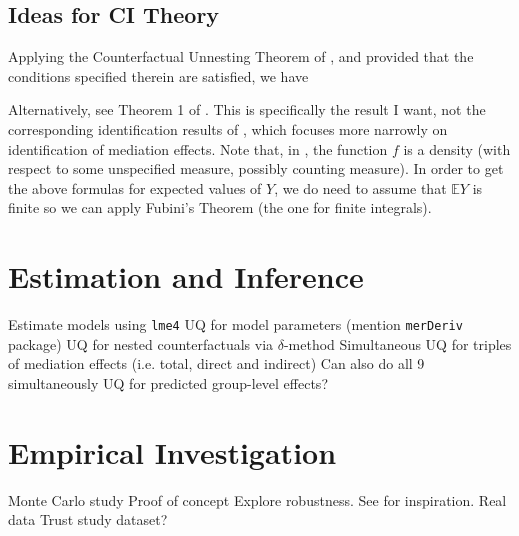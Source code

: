 \documentclass{article}
\newcommand{\bE}{\mathbb{E}}
\begin{document}
\subsection{Ideas for CI Theory}
Applying the Counterfactual Unnesting Theorem of \citet{Cor21}, and provided that the conditions specified therein are satisfied, we have

Alternatively, see Theorem 1 of \citet{Ima10I}. This is specifically the result I want, not the corresponding identification results of \citet{Ima10II}, which focuses more narrowly on identification of mediation effects. Note that, in \citet{Ima10I}, the function $f$ is a density (with respect to some unspecified measure, possibly counting measure). In order to get the above formulas for expected values of $Y$, we do need to assume that $\bE Y$ is finite so we can apply Fubini's Theorem (the one for finite integrals).






\section{Estimation and Inference}

\begin{outline}
    \1 Estimate models using \texttt{lme4}
    \1 UQ for model parameters (mention \texttt{merDeriv} package)
    \1 UQ for nested counterfactuals via $\delta$-method
    \1 Simultaneous UQ for triples of mediation effects (i.e. total, direct and indirect)
        \2 Can also do all 9 simultaneously
    \1 UQ for predicted group-level effects?
\end{outline}


\section{Empirical Investigation}

\begin{outline}
    \1 Monte Carlo study
        \2 Proof of concept
        \2 Explore robustness. See \citet{Sam23} for inspiration.
    \1 Real data
        \2 Trust study dataset?
\end{outline}


\end{document}
